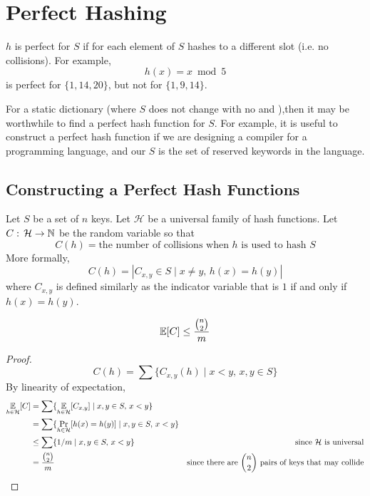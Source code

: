 \section{Perfect Hashing} 

$h$ is perfect for $S$ if for each element of $S$ hashes to a different slot (i.e. no collisions). For example,
$$
h(x) = x \bmod 5
$$
is perfect for $\{1,14,20\}$, but not for $\{1,9,14\}$.

For a static dictionary (where $S$ does not change with no  and ),then it may be worthwhile to find a perfect hash function for $S$. For example, it is useful to construct a perfect hash function if we are designing a compiler for a programming language, and our $S$ is the set of reserved keywords in the language.

\subsection{Constructing a Perfect Hash Functions}

Let $S$ be a set of $n$ keys. Let $\mathcal{H}$ be a universal family of hash functions. Let $C:\, \mathcal{H}\to\mathbb{N}$ be the random variable so that
$$
C(h) = \text{the number of collisions when $h$ is used to hash $S$}
$$
More formally,
$$
C(h) = \left| C_{x,y} \in S \mid x \neq y,\, h(x)=h(y) \right|
$$
where $C_{x,y}$ is defined similarly as the indicator variable that is $1$ if and only if $h(x)=h(y)$. 

\begin{lemma}
    $$
    \operatorname*{\mathbb{E}}[C] \leq \frac{{n \choose 2}}{m}
    $$
\end{lemma}

\begin{proof}
    $$C(h) = \sum \{ C_{x,y}(h) \mid x<y,\, x,y \in S \}$$
    By linearity of expectation,
    $$
    \begin{aligned}
        \operatorname*{\mathbb{E}}_{h \in \mathcal{H}} [C] &= \sum \{ \operatorname*{\mathbb{E}}_{h \in \mathcal{H} } [C_{x,y}] \mid x,y \in S,\, x < y\} \\
        &= \sum \{ \Pr_{h \in \mathcal{H}} [h(x)=h(y)] \mid x,y\in S,\, x<y\} \\
        &\leq \sum \{1/m \mid x,y \in S,\, x<y \} & \text{since $\mathcal{H}$ is universal} \\
        &= \frac{{n \choose 2}}{m} & \text{since there are ${n \choose 2}$ pairs of keys that may collide}
    \end{aligned}
    $$
\end{proof}

